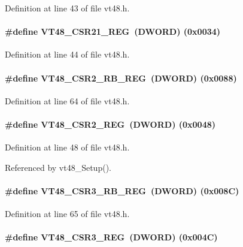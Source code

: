 Definition at line 43 of file vt48.h.
\paragraph[{VT48\_\-CSR21\_\-REG}]{\setlength{\rightskip}{0pt plus 5cm}\#define VT48\_\-CSR21\_\-REG~({\bf DWORD}) (0x0034)}\hfill\label{vt48_8h_aaa52228417bff799d38c76023bcb528b}


Definition at line 44 of file vt48.h.
\paragraph[{VT48\_\-CSR2\_\-RB\_\-REG}]{\setlength{\rightskip}{0pt plus 5cm}\#define VT48\_\-CSR2\_\-RB\_\-REG~({\bf DWORD}) (0x0088)}\hfill\label{vt48_8h_a7a51c505dfcf0ddcca8a4eceb971a4f9}


Definition at line 64 of file vt48.h.
\paragraph[{VT48\_\-CSR2\_\-REG}]{\setlength{\rightskip}{0pt plus 5cm}\#define VT48\_\-CSR2\_\-REG~({\bf DWORD}) (0x0048)}\hfill\label{vt48_8h_ab5e7d9d87e6210c9c67d93c43ec2a23f}


Definition at line 48 of file vt48.h.

Referenced by vt48\_\-Setup().
\paragraph[{VT48\_\-CSR3\_\-RB\_\-REG}]{\setlength{\rightskip}{0pt plus 5cm}\#define VT48\_\-CSR3\_\-RB\_\-REG~({\bf DWORD}) (0x008C)}\hfill\label{vt48_8h_ac204dea514ea8973a6e76f9e73115981}


Definition at line 65 of file vt48.h.
\paragraph[{VT48\_\-CSR3\_\-REG}]{\setlength{\rightskip}{0pt plus 5cm}\#define VT48\_\-CSR3\_\-REG~({\bf DWORD}) (0x004C)}\hfill\label{vt48_8h_ae5ce4f49b4032c2c41dab280e69bcd1e}



